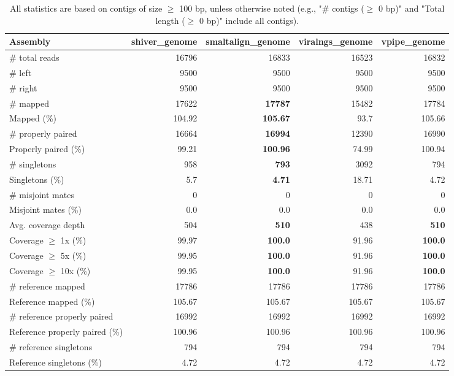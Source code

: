 \documentclass[12pt,a4paper]{article}
\begin{document}
\begin{table}[ht]
\begin{center}
\caption{All statistics are based on contigs of size $\geq$ 100 bp, unless otherwise noted (e.g., "\# contigs ($\geq$ 0 bp)" and "Total length ($\geq$ 0 bp)" include all contigs).}
\begin{tabular}{|l*{4}{|r}|}
\hline
Assembly & shiver\_genome & smaltalign\_genome & viralngs\_genome & vpipe\_genome \\ \hline
\# total reads & 16796 & 16833 & 16523 & 16832 \\ \hline
\# left & 9500 & 9500 & 9500 & 9500 \\ \hline
\# right & 9500 & 9500 & 9500 & 9500 \\ \hline
\# mapped & 17622 & {\bf 17787} & 15482 & 17784 \\ \hline
Mapped (\%) & 104.92 & {\bf 105.67} & 93.7 & 105.66 \\ \hline
\# properly paired & 16664 & {\bf 16994} & 12390 & 16990 \\ \hline
Properly paired (\%) & 99.21 & {\bf 100.96} & 74.99 & 100.94 \\ \hline
\# singletons & 958 & {\bf 793} & 3092 & 794 \\ \hline
Singletons (\%) & 5.7 & {\bf 4.71} & 18.71 & 4.72 \\ \hline
\# misjoint mates & 0 & 0 & 0 & 0 \\ \hline
Misjoint mates (\%) & 0.0 & 0.0 & 0.0 & 0.0 \\ \hline
Avg. coverage depth & 504 & {\bf 510} & 438 & {\bf 510} \\ \hline
Coverage $\geq$ 1x (\%) & 99.97 & {\bf 100.0} & 91.96 & {\bf 100.0} \\ \hline
Coverage $\geq$ 5x (\%) & 99.95 & {\bf 100.0} & 91.96 & {\bf 100.0} \\ \hline
Coverage $\geq$ 10x (\%) & 99.95 & {\bf 100.0} & 91.96 & {\bf 100.0} \\ \hline
\# reference mapped & 17786 & 17786 & 17786 & 17786 \\ \hline
Reference mapped (\%) & 105.67 & 105.67 & 105.67 & 105.67 \\ \hline
\# reference properly paired & 16992 & 16992 & 16992 & 16992 \\ \hline
Reference properly paired (\%) & 100.96 & 100.96 & 100.96 & 100.96 \\ \hline
\# reference singletons & 794 & 794 & 794 & 794 \\ \hline
Reference singletons (\%) & 4.72 & 4.72 & 4.72 & 4.72 \\ \hline

\end{tabular}
\end{center}
\end{table}
\end{document}
